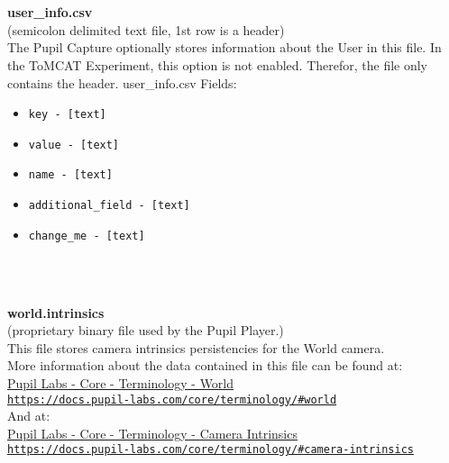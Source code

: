 \begin{description}
\begin{addmargin}[0em]{0em}
    \textbf{\\\\}
    \begin{addmargin}[1em]{0em} %
        \label{user_info.csv}
        \textbf{user\_info.csv}\\(semicolon delimited text file, 1st row is a header)\\
        The Pupil Capture optionally stores information about the User in this file.
        In the ToMCAT Experiment, this option is not enabled. Therefor, the file only contains the header.
        user\_info.csv Fields:
        \begin{itemize}
            \item \verb|key - [text]|
            \item \verb|value - [text]|
            \item \verb|name - [text]|
            \item \verb|additional_field - [text]|
            \item \verb|change_me - [text]|
        \end{itemize}
    \end{addmargin} %

    \textbf{\\\\}
    \begin{addmargin}[1em]{0em} %
        \label{world.intrinsics}
        \textbf{world.intrinsics}\\(proprietary binary file used by the Pupil Player.)\\
        This file stores camera intrinsics persistencies for the World camera.\\
        More information about the data contained in this file can be found at:\\
        \href{https://docs.pupil-labs.com/core/terminology/#world}
        {{Pupil Labs - Core - Terminology - World}\\\nolinkurl{https://docs.pupil-labs.com/core/terminology/\#world}}\\
        And at:\\
        \href{https://docs.pupil-labs.com/core/terminology/#camera-intrinsics}
        {{Pupil Labs - Core - Terminology - Camera Intrinsics}\\\nolinkurl{https://docs.pupil-labs.com/core/terminology/\#camera-intrinsics}}
    \end{addmargin} %


\end{addmargin}
\end{description}
